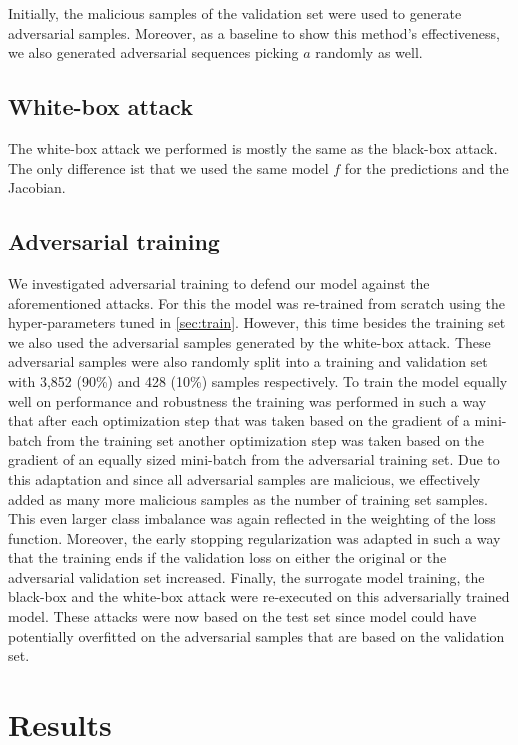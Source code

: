 \documentclass[final]{cvpr}
\begin{document}
Initially, the malicious samples of the validation set were used to generate 
adversarial samples. Moreover, as a baseline to show this method's 
effectiveness, we also generated adversarial sequences picking $a$ randomly as 
well.

\subsection{White-box attack}

The white-box attack we performed is mostly the same as the black-box attack. 
The only difference ist that we used the same model $f$ for the predictions and 
the Jacobian.

\subsection{Adversarial training} 
We investigated adversarial training to defend our model against the 
aforementioned attacks. 
For this the model was re-trained from scratch using the hyper-parameters tuned 
in \autoref{sec:train}. However, this time besides the training set we also 
used the adversarial samples generated by the white-box attack. These 
adversarial samples were also randomly split into a training and validation set 
with 3,852 (90\%) and 428 (10\%) samples respectively. To train the model 
equally well on 
performance and robustness the training was performed in such a way that after 
each optimization step that was taken based on the gradient of a mini-batch 
from the training set another optimization step was taken based on 
the gradient of an equally sized mini-batch from the adversarial training
set. Due to this adaptation and since all adversarial samples are malicious, we 
effectively added as many more malicious samples as the number of training set 
samples. This even larger class imbalance was again reflected in the weighting 
of the 
loss function. Moreover, the early stopping regularization was adapted in such 
a way that the training ends if the validation loss on either the original or 
the adversarial validation set increased. Finally, the surrogate model 
training, the black-box and the white-box attack were re-executed on this 
adversarially trained model. These attacks were now based on the test set since 
model could have potentially overfitted on the adversarial samples that are 
based on the validation set.

\section{Results}
\label{sec:results}
\end{document}
